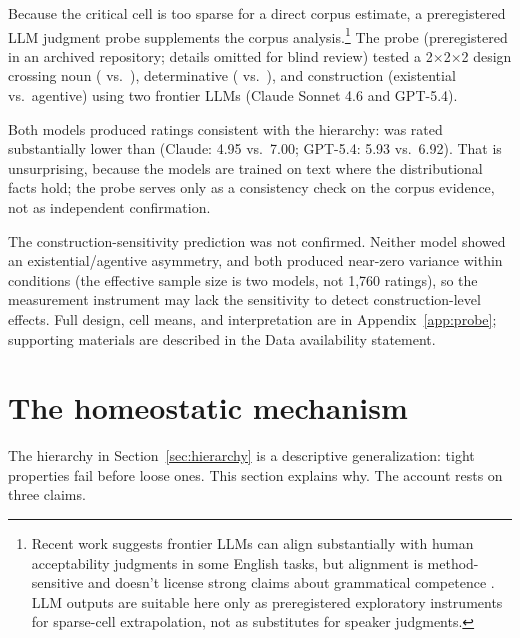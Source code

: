 \documentclass[12pt,a4paper]{article}
\begin{document}
Because the critical  cell is too sparse for a direct corpus estimate, a preregistered LLM judgment probe supplements the corpus analysis.\footnote{Recent work suggests frontier LLMs can align substantially with human acceptability judgments in some English tasks, but alignment is method-sensitive and doesn't license strong claims about grammatical competence \citep{qiu2024,qiu2025,hu2024,hu-levy2023,sinha2023,dentella2023,leivada2024reply,juzek2024}. LLM outputs are suitable here only as preregistered exploratory instruments for sparse-cell extrapolation, not as substitutes for speaker judgments.} The probe (preregistered in an archived repository; details omitted for blind review) tested a 2$\times$2$\times$2 design crossing noun ( vs.\ ), determinative ( vs.\ ), and construction (existential vs.\ agentive) using two frontier LLMs (Claude Sonnet 4.6 and GPT-5.4).

Both models produced ratings consistent with the hierarchy:  was rated substantially lower than  (Claude: 4.95 vs.\ 7.00; GPT-5.4: 5.93 vs.\ 6.92). That is unsurprising, because the models are trained on text where the distributional facts hold; the probe serves only as a consistency check on the corpus evidence, not as independent confirmation.

The construction-sensitivity prediction was not confirmed. Neither model showed an existential/agentive asymmetry, and both produced near-zero variance within conditions (the effective sample size is two models, not 1{,}760 ratings), so the measurement instrument may lack the sensitivity to detect construction-level effects. Full design, cell means, and interpretation are in Appendix~\ref{app:probe}; supporting materials are described in the Data availability statement.

\section{The homeostatic mechanism}\label{sec:mechanism}

The hierarchy in Section~\ref{sec:hierarchy} is a descriptive generalization: tight properties fail before loose ones. This section explains why. The account rests on three claims.
\end{document}
